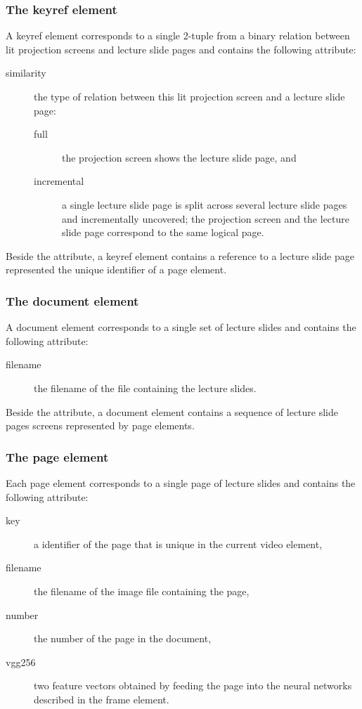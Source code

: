 \subsubsection*{The keyref element}
A keyref element corresponds to a single 2-tuple from a binary relation between
lit projection screens and lecture slide pages and contains the following
attribute:
\begin{description}
  \item[similarity] the type of relation between this lit projection screen and
    a lecture slide page:
    \begin{description}
      \item[full] the projection screen shows the lecture slide page, and
      \item[incremental] a single  lecture slide page is split
        across several lecture slide pages and incrementally uncovered; the
        projection screen and the lecture slide page correspond to the same
        logical page.
    \end{description}
\end{description}
Beside the attribute, a keyref element contains a reference to a lecture slide
page represented the unique identifier of a page element.

\subsubsection*{The document element}
A document element corresponds to a single set of lecture slides and contains
the following attribute:
\begin{description}
  \item[filename] the filename of the  file containing the lecture slides.
\end{description}
Beside the attribute, a document element contains a sequence of lecture slide
pages screens represented by page elements.

\subsubsection*{The page element}
Each page element corresponds to a single page of lecture slides and contains
the following attribute:
\begin{description}
  \item[key] a identifier of the page that is unique in the current video element,
  \item[filename] the filename of the image file containing the page,
  \item[number] the number of the page in the  document,
  \item[vgg256] two feature vectors obtained by feeding the page into the
    neural networks described in the frame element.
\end{description}

